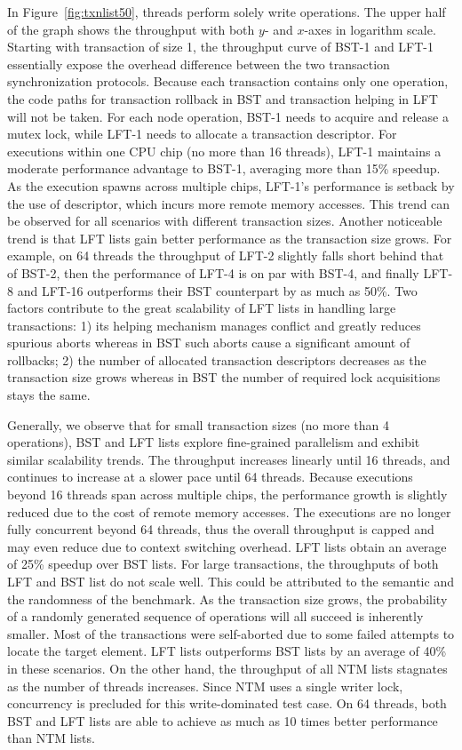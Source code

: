 \documentclass{sig-alternate-05-2015}
\begin{document}
In Figure~\ref{fig:txnlist50}, threads perform solely write operations.
The upper half of the graph shows the throughput with both $y$- and $x$-axes in logarithm scale.
Starting with transaction of size 1, the throughput curve of BST-1 and LFT-1 essentially expose the overhead difference between the two transaction synchronization protocols.
Because each transaction contains only one operation, the code paths for transaction rollback in BST and transaction helping in LFT will not be taken.
For each node operation, BST-1 needs to acquire and release a mutex lock, while LFT-1 needs to allocate a transaction descriptor.
For executions within one CPU chip (no more than 16 threads), LFT-1 maintains a moderate performance advantage to BST-1, averaging more than 15\% speedup.
As the execution spawns across multiple chips, LFT-1's performance is setback by the use of descriptor, which incurs more remote memory accesses.
This trend can be observed for all scenarios with different transaction sizes.
Another noticeable trend is that LFT lists gain better performance as the transaction size grows.
For example, on 64 threads the throughput of LFT-2 slightly falls short behind that of BST-2, then the performance of LFT-4 is on par with BST-4, and finally LFT-8 and LFT-16 outperforms their BST counterpart by as much as 50\%.
Two factors contribute to the great scalability of LFT lists in handling large transactions: 1) its helping mechanism manages conflict and greatly reduces spurious aborts whereas in BST such aborts cause a significant amount of rollbacks; 2) the number of allocated transaction descriptors decreases as the transaction size grows whereas in BST the number of required lock acquisitions stays the same.

Generally, we observe that for small transaction sizes (no more than 4 operations), BST and LFT lists explore fine-grained parallelism and exhibit similar scalability trends.
The throughput increases linearly until 16 threads, and continues to increase at a slower pace until 64 threads.
Because executions beyond 16 threads span across multiple chips, the performance growth is slightly reduced due to the cost of remote memory accesses.
The executions are no longer fully concurrent beyond 64 threads, thus the overall throughput is capped and may even reduce due to context switching overhead.
LFT lists obtain an average of 25\% speedup over BST lists.
For large transactions, the throughputs of both LFT and BST list do not scale well.
This could be attributed to the semantic and the randomness of the benchmark.
As the transaction size grows, the probability of a randomly generated sequence of operations will all succeed is inherently smaller.
Most of the transactions were self-aborted due to some failed attempts to locate the target element.
LFT lists outperforms BST lists by an average of 40\% in these scenarios.
On the other hand, the throughput of all NTM lists stagnates as the number of threads increases.
Since NTM uses a single writer lock, concurrency is precluded for this write-dominated test case.
On 64 threads, both BST and LFT lists are able to achieve as much as 10 times better performance than NTM lists.
\end{document}
